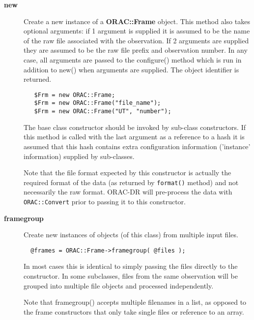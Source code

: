 \begin{description}

\item[{\textbf{new}}] \mbox{}

Create a new instance of a \textbf{ORAC::Frame} object.  This method also
takes optional arguments: if 1 argument is supplied it is assumed to
be the name of the raw file associated with the observation.  If 2
arguments are supplied they are assumed to be the raw file prefix and
observation number.  In any case, all arguments are passed to the
configure() method which is run in addition to new() when arguments
are supplied.  The object identifier is returned.

\begin{verbatim}
   $Frm = new ORAC::Frame;
   $Frm = new ORAC::Frame("file_name");
   $Frm = new ORAC::Frame("UT", "number");
\end{verbatim}


The base class constructor should be invoked by sub-class constructors.
If this method is called with the last argument as a reference to
a hash it is assumed that this hash contains extra configuration
information ('instance' information) supplied by sub-classes.



Note that the file format expected by this constructor is actually the
required format of the data (as returned by \texttt{format()} method) and not
necessarily the raw format.  ORAC-DR will pre-process the data with
\texttt{ORAC::Convert} prior to passing it to this constructor.


\item[{\textbf{framegroup}}] \mbox{}

Create new instances of objects (of this class) from multiple
input files.

\begin{verbatim}
  @frames = ORAC::Frame->framegroup( @files );
\end{verbatim}


In most cases this is identical to simply passing the files directly
to the constructor. In some subclasses, files from the same
observation will be grouped into multiple file objects and processed
independently.



Note that framegroup() accepts multiple filenames in a list, as opposed
to the frame constructors that only take single files or reference to
an array.




\end{description}
